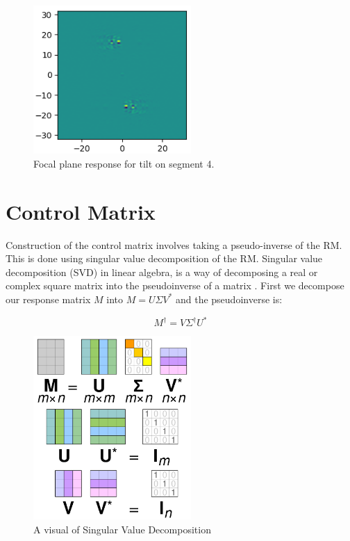 \begin{figure}[H]
    \centering
    \includegraphics[width = 6cm]{Figures/I_diff.png}
    \caption{Focal plane response for tilt on segment 4.}
    \label{fig:I_diff}
\end{figure}



\section{Control Matrix}
\label{sec:CM}

Construction of the control matrix involves taking a pseudo-inverse of the RM.  This is done using singular value
decomposition of the RM.  Singular value decomposition (SVD) in linear algebra, is a way of decomposing a real or
complex square matrix into the pseudoinverse of a matrix \cite{Hestenes1958InversionResults}.  First we decompose
our response matrix $M$ into $M = U \Sigma V^{\ast}$ and the pseudoinverse is:

\begin{equation}
    M^{\dagger} = V \Sigma^{\dagger} U^{\ast}
    \label{eq:SVD}
\end{equation}

\begin{figure}[H]
    \centering
    \includegraphics[width = 6cm]{Figures/Singular_value_decomposition_visualisation.jpg}
    \caption{A visual of Singular Value Decomposition}
    \label{fig:SVD}
\end{figure}

